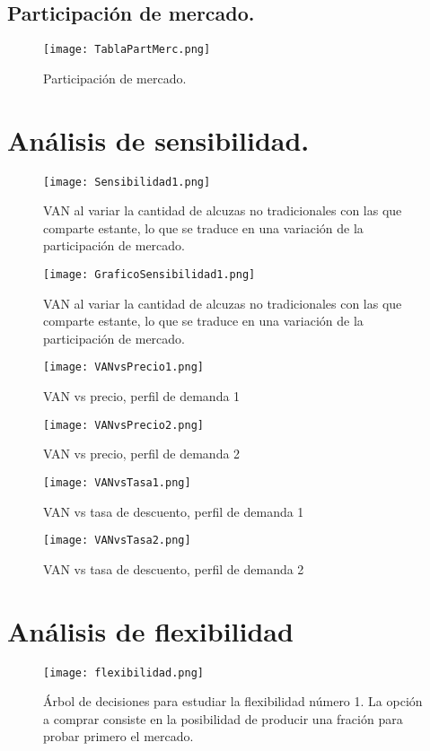 \newpage
\subsection{Participación de mercado.}
 \label{PartMerc}
  \begin{figure}[H]
    \label{TablaPartMerc}
    \centering
    \texttt{[image: TablaPartMerc.png]}
    \caption{Participación de mercado.}
  \end{figure}


\section{Análisis de sensibilidad.}
\label{AnSensibilidad1}
  \begin{figure}[H]
  \centering
  \texttt{[image: Sensibilidad1.png]}
  \caption{VAN al variar la cantidad de alcuzas no tradicionales con las que comparte estante, lo que se traduce en una variación de la participación de mercado.}
  \label{Sensibilidad1}
  \end{figure}

\begin{figure}[H]
\centering
\texttt{[image: GraficoSensibilidad1.png]}
\caption{VAN al variar la cantidad de alcuzas no tradicionales con las que comparte estante, lo que se traduce en una variación de la participación de mercado.}
\label{GraficoSensibilidad1}
\end{figure}

\begin{figure}[H]
\centering
\texttt{[image: VANvsPrecio1.png]}
\caption{VAN vs precio, perfil de demanda 1}
\label{VANvsPrecio1}
\end{figure}


\begin{figure}[H]
\centering
\texttt{[image: VANvsPrecio2.png]}
\caption{VAN vs precio, perfil de demanda 2}
\label{VANvsPrecio2}
\end{figure}

\begin{figure}[H]
\centering
\texttt{[image: VANvsTasa1.png]}
\caption{VAN vs tasa de descuento, perfil de demanda 1}
\label{VANvsTasa1}
\end{figure}

\begin{figure}[H]
\centering
\texttt{[image: VANvsTasa2.png]}
\caption{VAN vs tasa de descuento, perfil de demanda 2}
\label{VANvsTasa2}
\end{figure}




\section{Análisis de flexibilidad}
\begin{figure}[H]
\centering
\texttt{[image: flexibilidad.png]}
\caption{Árbol de decisiones para estudiar la flexibilidad número 1. La opción a comprar consiste en la posibilidad de producir una fración para probar primero el mercado.}
\label{flexibilidad}
\end{figure}
